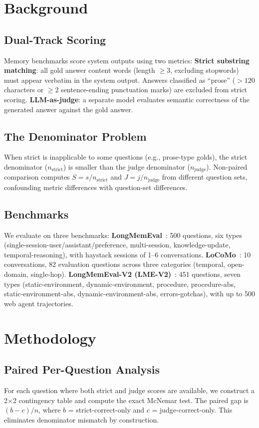 \documentclass{article}
\begin{document}
\section{Background}
\subsection{Dual-Track Scoring}
Memory benchmarks score system outputs using two metrics:
\textbf{Strict substring matching}: all gold answer content words (length $\geq 3$, excluding stopwords) must appear verbatim in the system output. Answers classified as ``prose'' ($>120$ characters or $\geq 2$ sentence-ending punctuation marks) are excluded from strict scoring.
\textbf{LLM-as-judge}: a separate model evaluates semantic correctness of the generated answer against the gold answer.

\subsection{The Denominator Problem}
When strict is inapplicable to some questions (e.g., prose-type golds), the strict denominator ($n_{\text{strict}}$) is smaller than the judge denominator ($n_{\text{judge}}$). Non-paired comparison computes $S = s/n_{\text{strict}}$ and $J = j/n_{\text{judge}}$ from different question sets, confounding metric differences with question-set differences.

\subsection{Benchmarks}
We evaluate on three benchmarks:
\textbf{LongMemEval}~\citep{wu2024longmemeval}: 500 questions, six types (single-session-user/assistant/preference, multi-session, knowledge-update, temporal-reasoning), with haystack sessions of 1--6 conversations.
\textbf{LoCoMo}~\citep{locomo2024}: 10 conversations, 82 evaluation questions across three categories (temporal, open-domain, single-hop).
\textbf{LongMemEval-V2 (LME-V2)}~\citep{longmemevalv2}: 451 questions, seven types (static-environment, dynamic-environment, procedure, procedure-abs, static-environment-abs, dynamic-environment-abs, errors-gotchas), with up to 500 web agent trajectories.

\section{Methodology}
\subsection{Paired Per-Question Analysis}
For each question where both strict and judge scores are available, we construct a 2$\times$2 contingency table and compute the exact McNemar test. The paired gap is $(b - c)/n$, where $b$ = strict-correct-only and $c$ = judge-correct-only. This eliminates denominator mismatch by construction.
\end{document}
